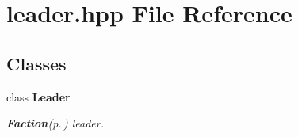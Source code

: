 \section{leader.hpp File Reference}
\label{leader_8hpp}
\subsection*{Classes}
\begin{CompactItemize}
\item 
class {\bf Leader}
\begin{CompactList}\small\item\em {\bf Faction}{\rm (p.\,\pageref{classFaction})} leader. \item\end{CompactList}\end{CompactItemize}
